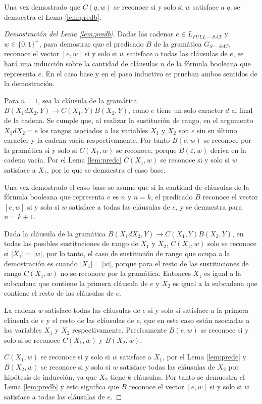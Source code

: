 Una vez demostrado que $C(q,w)$ se reconoce si y solo si $w$ satisface a $q$, se demuestra el Lema \ref{lem:predb}.

\begin{proof}[Demostración del Lema \ref{lem:predb}]
    Dadas las cadenas $e\in L_{FULL-SAT}$ y $w\in \{0,1\}^+$, para demostrar que el predicado $B$ de la gramática $G_{S-SAT}$, reconoce el vector $[e,w]$  si y solo si $w$ satisface a todas las cláusulas de $e$,
    se hará una inducción sobre la cantidad de cláusulas $n$ de la fórmula booleana que representa $e$. En el caso base y en el paso inductivo
    se prueban ambos sentidos de la demostración.
    
    Para $n=1$, sea la cláusula de la gramática $B(X_1dX_2,Y)\to C(X_1,Y) B(X_2,Y)$, como $e$ tiene un solo caracter $d$ al final de la cadena. Se cumple que, al realizar la sustitución de rango, en el argumento $X_1dX_2=e$ los 
    rangos asociados a las variables $X_1$ y $X_2$ son $e$ sin su último caracter y la cadena vacía respectivamente. Por tanto $B(e,w)$ se reconoce por la gramática si y solo si $C(X_1,w)$ se reconoce, porque $B(\varepsilon, w)$ deriva en la cadena vacía. Por el Lema \ref{lem:predc} $C(X_1,w)$ se reconoce si y solo si $w$ satisface a $X_1$, por lo que se demuestra el caso base. 
    
    Una vez demostrado el caso base se asume que si la cantidad de cláusulas de la fórmula booleana que representa $e$ es $n$ y $n=k$, el predicado $B$ reconoce el vector $[e,w]$  si y solo si $w$ satisface a todas las cláusulas de $e$, y se demuestra para $n=k+1$.
    
    Dada la cláusula de la gramática $B(X_1dX_2,Y)\to C(X_1,Y) B(X_2,Y)$, en todas las posibles sustituciones de rango de $X_1$ y $X_2$, $C(X_1,w)$ solo se reconoce si $|X_1|=|w|$, por lo tanto, el caso de sustitución de rango que ocupa a la demostración es cuando $|X_1|=|w|$, porque para el resto de las sustituciones de rango $C(X_1,w)$ no se reconoce por la gramática.
    Entonces $X_1$ es igual a la subcadena que contiene la primera cláusula de $e$ y $X_2$ es igual a la subcadena que contiene el resto de las cláusulas de $e$.
    
    La cadena $w$ satisface todas las cláusulas de $e$ si y solo si satisface a la primera cláusula de $e$ y el resto de las cláusulas de $e$, que en este caso están asociadas a las variables $X_1$ y $X_2$ respectivamente.  Precisamente $B(e,w)$ se reconoce si y solo si se reconoce $C(X_1,w)$ y $B(X_2,w)$.
    
    $C(X_1,w)$ se reconoce si y solo si $w$ satisface a $X_1$, por el Lema \ref{lem:predc} y $B(X_2,w)$ se reconoce si y solo si $w$ satisface todas las cláusulas de $X_2$ por hipótesis de inducción, ya que $X_2$ tiene $k$ cláusulas. Por tanto se demuestra el Lema \ref{lem:predb} y esto significa que $B$ reconoce el vector $[e,w]$  si y solo si $w$ satisface a todas las cláusulas de $e$. 
\end{proof}

